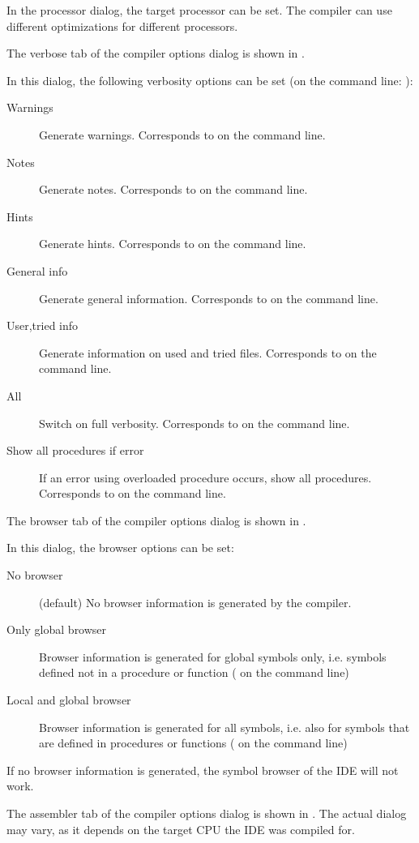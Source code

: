 In the processor dialog, the target processor can be set. The
compiler can use different optimizations for different processors.


The verbose tab of the compiler options dialog is shown in
.


In this dialog, the following verbosity options can be set
(on the command line: ):
\begin{description}
\item[Warnings] Generate warnings. 
Corresponds to  on the command line.
\item[Notes] Generate notes. 
Corresponds to  on the command line.
\item[Hints] Generate hints. 
Corresponds to  on the command line.
\item[General info] Generate general information. 
Corresponds to  on the command line.
\item[User,tried info] Generate information on used and tried files. 
Corresponds to  on the command line.
\item[All] Switch on full verbosity. 
Corresponds to  on the command line.
\item[Show all procedures if error] If an error using overloaded procedure
occurs, show all procedures. 
Corresponds to  on the command line.
\end{description}

The browser tab of the compiler options dialog is shown in .


In this dialog, the browser options can be set:
\begin{description}
\item[No browser] (default) No browser information is generated by the
compiler.
\item[Only global browser] Browser information is generated for global
symbols only, i.e. symbols defined not in a procedure or function ( on the command line)
\item[Local and global browser] Browser information is generated for all
symbols, i.e. also for symbols that are defined in procedures or functions
 ( on the command line)
\end{description}
\begin{remark}
If no browser information is generated, the symbol browser of the IDE will
not work.
\end{remark}
The assembler tab of the compiler options dialog is shown in
. The actual dialog may vary, as it depends on the 
target CPU the IDE was compiled for.


